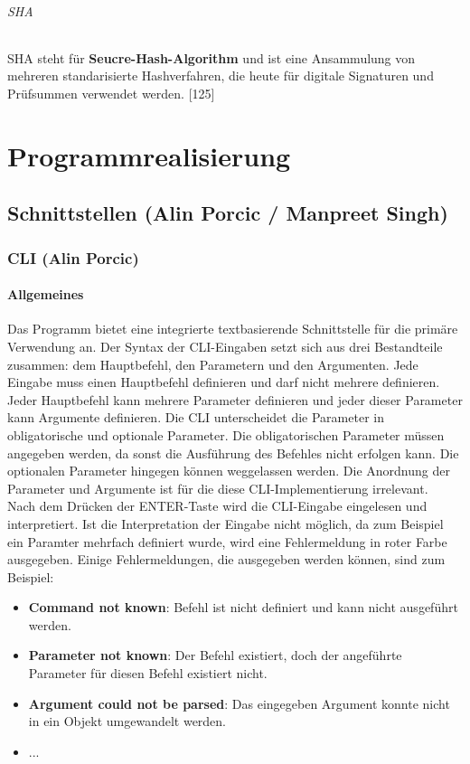 \documentclass[12pt,a4paper]{report}
\begin{document}
\begin{onehalfspace}
\paragraph{SHA}

SHA steht für \textbf{Seucre-Hash-Algorithm} und ist eine Ansammulung von mehreren standarisierte Hashverfahren, die heute für digitale Signaturen und Prüfsummen verwendet werden. [125]

\part{Programmrealisierung}

\chapter{Schnittstellen (Alin Porcic / Manpreet Singh)}

\section{CLI (Alin Porcic)}

\subsection{Allgemeines}

Das Programm bietet eine integrierte textbasierende Schnittstelle für die primäre Verwendung an. Der Syntax der CLI-Eingaben setzt sich aus drei Bestandteile zusammen: dem Hauptbefehl, den Parametern und den Argumenten. Jede Eingabe muss einen Hauptbefehl definieren und darf nicht mehrere definieren. Jeder Hauptbefehl kann mehrere Parameter definieren und jeder dieser Parameter kann Argumente definieren. Die CLI unterscheidet die Parameter in obligatorische und optionale Parameter. Die obligatorischen Parameter müssen angegeben werden, da sonst die Ausführung des Befehles nicht erfolgen kann. Die optionalen Parameter hingegen können weggelassen werden. Die Anordnung der Parameter und Argumente ist für die diese CLI-Implementierung irrelevant.\\

Nach dem Drücken der ENTER-Taste wird die CLI-Eingabe eingelesen und interpretiert. Ist die Interpretation der Eingabe nicht möglich, da zum Beispiel ein Paramter mehrfach definiert wurde, wird eine Fehlermeldung in roter Farbe ausgegeben. Einige Fehlermeldungen, die ausgegeben werden können, sind zum Beispiel:

\begin{itemize}
\item \textbf{Command not known}: Befehl ist nicht definiert und kann nicht ausgeführt werden.
\item \textbf{Parameter not known}: Der Befehl existiert, doch der angeführte Parameter für diesen Befehl existiert nicht.
\item \textbf{Argument could not be parsed}: Das eingegeben Argument konnte nicht in ein Objekt umgewandelt werden.
\item ...
\end{itemize}


\end{onehalfspace}
\end{document}
